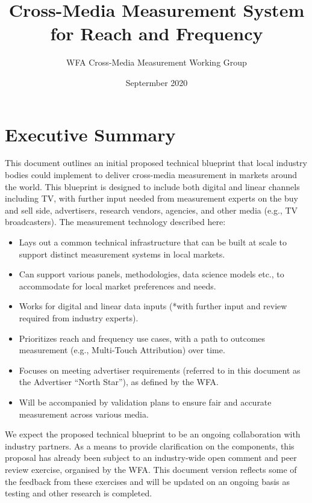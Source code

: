 \documentclass[]{article}
\title{Cross-Media Measurement System for Reach and Frequency}
\author{WFA Cross-Media Measurement Working Group}
\date{Septermber 2020}
\providecommand{\tightlist}{%
  \setlength{\itemsep}{0pt}\setlength{\parskip}{0pt}}
\begin{document}
\maketitle

\vspace*{0.3cm}
\section{Executive Summary}

This document outlines an initial proposed technical blueprint that local industry bodies could implement to deliver cross-media measurement in markets around the world. This blueprint is designed to include both digital and linear channels including TV, with further input needed from measurement experts on the buy and sell side, advertisers, research vendors, agencies, and other media (e.g., TV broadcasters). The measurement technology described here:

\begin{itemize}
\tightlist
\item
  Lays out a common technical infrastructure that can be built at scale
  to support distinct measurement systems in local markets.
\item
  Can support various panels, methodologies, data science models etc.,
  to accommodate for local market preferences and needs.
\item
  Works for digital and linear data inputs (*with further input and
  review required from industry experts).
\item
  Prioritizes reach and frequency use cases, with a path to outcomes
  measurement (e.g., Multi-Touch Attribution) over time.
\item
  Focuses on meeting advertiser requirements (referred to in this
  document as the Advertiser ``North Star''), as defined by the WFA.
\item
  Will be accompanied by validation plans to ensure fair and accurate
  measurement across various media.
\end{itemize}

We expect the proposed technical blueprint to be an ongoing collaboration with industry partners. As a means to provide clarification on the components, this proposal has already been subject to an industry-wide open comment and peer review exercise, organised by the WFA. This document version reflects some of the feedback from these exercises and will be updated on an ongoing basis as testing and other research is completed.
\end{document}
